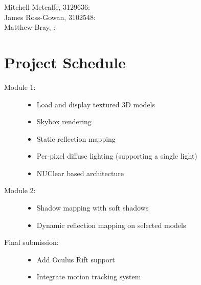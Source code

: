 \documentclass[11pt]{scrartcl} %
\begin{document}
    \begin{description}
        \item[Mitchell Metcalfe, 3129636:]

        \item[James Ross-Gowan, 3102548:]

        \item[Matthew Bray, :]

    \end{description}
    
\section*{Project Schedule}

\begin{description}
    \item[Module 1:]
        \begin{itemize}
            \item Load and display textured 3D models
            \item Skybox rendering
            \item Static reflection mapping
            \item Per-pixel diffuse lighting (supporting a single light)
            \item NUClear based architecture
        \end{itemize}
    \item[Module 2:]
        \begin{itemize}
            \item Shadow mapping with soft shadows
            \item Dynamic reflection mapping on selected models
        \end{itemize}
    \item[Final submission:]
        \begin{itemize}
            \item Add Oculus Rift support
            \item Integrate motion tracking system
        \end{itemize}
\end{description}
\end{document}
